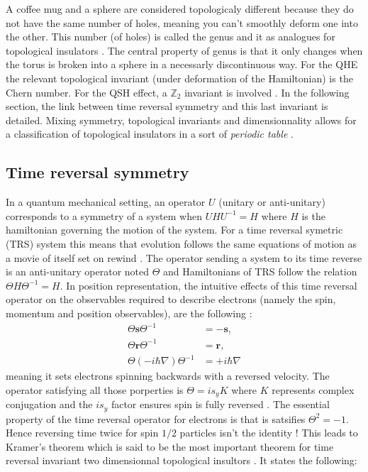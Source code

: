 A coffee mug and a sphere are considered topologicaly different because they do not have the same number of holes, meaning you can't smoothly deform one into the other. 
This number (of holes) is called the genus and it as analogues for topological insulators \cite{batra_physics_2020}. The central property of genus is that it only changes when the torus is broken into a sphere in a necessarly discontinuous way. %
For the QHE the relevant topological invariant %
(under deformation of the Hamiltonian) is the Chern number. For the QSH effect, a $\mathbb{Z}_2$ invariant is involved \cite{kane_topological_2013}. In the following section, the link between time reversal symmetry and this last invariant is detailed.  Mixing symmetry, topological invariants and dimensionnality allows for a classification of topological insulators in a sort of \textit{periodic table} \cite{hasan_topological_2010}. 

\subsection{Time reversal symmetry \label{TRS}}
In a quantum mechanical setting, an operator $U$ (unitary or anti-unitary) corresponds to a symmetry of a system when $U H U^{-1} = H$ where $H$ is the hamiltonian governing the motion of the system. For a time reversal symetric (TRS) system this means that evolution follows the same equations of motion as a movie of itself set on rewind \cite{shankar_topological_2018}. The operator sending a system to its time reverse is an anti-unitary operator noted $\Theta$ and Hamiltonians of TRS follow the relation $\Theta H \Theta^{-1} = H$. In position representation, the intuitive effects of this time reversal operator on the observables required to describe electrons (namely the spin, momentum and position observables), are the following \cite{shankar_topological_2018} : 
\begin{align*}
    \Theta \mathbf{s} \Theta^{-1} &=-\mathbf{s}, \\
    \Theta \mathbf{r} \Theta^{-1} &=\mathbf{r}, \\
    \Theta (-i\hbar\nabla) \Theta^{-1} &=+i\hbar\nabla
\end{align*}
meaning it sets electrons spinning backwards with a reversed velocity. The operator satisfying all those porperties is $\Theta = i s_y K$ where $K$ represents complex conjugation and the $i s_y$ factor ensures spin is fully reversed \cite{bernevig_topological_2013}. The essential property of the time reversal operator for electrons is that is satsifies $\Theta^2 = -1$. Hence reversing time twice for spin $1/2$ particles isn't the identity \cite{hasan_topological_2010}! This leads to Kramer's theorem which is said to be the most important theorem for time reversal invariant two dimensionnal topological insultors \cite{bernevig_topological_2013}. It states the following:\\

